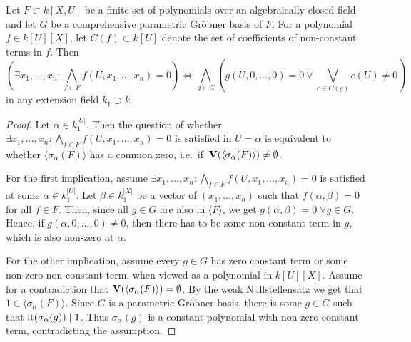 \begin{theorem}
  Let $F \subset k[X, U]$ be a finite set of polynomials over an algebraically closed field and let $G$ be a comprehensive parametric Gröbner basis of $F$. For a polynomial $f \in k[U][X]$, let $C(f) \subset k[U]$ denote the set of coefficients of non-constant terms in $f$. Then \[ \left(\exists x_{1}, \dots, x_{n} : \bigwedge_{f \in F} f(U, x_{1}, \dots, x_{n}) = 0 \right) \iff \bigwedge_{g \in G} \left( g(U, 0, \dots, 0) = 0 \lor \bigvee_{c \in C(g)} c(U) \neq 0 \right)\] in any extension field $k_{1} \supset k$.
\end{theorem}
\begin{proof}
  Let $\alpha \in k_{1}^{|U|}$. Then the question of whether $\exists x_{1}, \dots, x_{n} : \bigwedge_{f \in F} f(U, x_{1}, \dots, x_{n}) = 0$ is satisfied in $U = \alpha$ is equivalent to whether $\langle \sigma_{\alpha}(F) \rangle$ has a common zero, i.e.\ if $\,\operatorname{\mathbf V}(\langle \sigma_{\alpha}(F) \rangle) \neq \emptyset$.

  For the first implication, assume $\exists x_{1}, \dots, x_{n} : \bigwedge_{f \in F} f(U, x_{1}, \dots, x_{n}) = 0$ is satisfied at some $\alpha \in k_{1}^{|U|}$. Let $\beta \in k_{1}^{|X|}$ be a vector of $(x_{1}, \dots, x_{n})$ such that $f(\alpha, \beta) = 0$ for all $f \in F$. Then, since all $g \in G$ are also in $\langle F \rangle$, we get $g(\alpha, \beta) = 0 \; \forall g \in G$. Hence, if $g(\alpha, 0, \dots, 0) \neq 0$, then there has to be some non-constant term in $g$, which is also non-zero at $\alpha$.

  For the other implication, assume every $g \in G$ has zero constant term or some non-zero non-constant term, when viewed as a polynomial in $k[U][X]$. Assume for a contradiction that $\operatorname{\mathbf V}(\langle \sigma_{\alpha}(F) \rangle) = \emptyset$. By the weak Nullstellensatz we get that $1 \in \langle \sigma_{\alpha}(F) \rangle$. Since $G$ is a parametric Gröbner basis, there is some $g \in G$ such that $\operatorname{lt}(\sigma_{\alpha}(g)) \mid 1$. Thus $\sigma_{\alpha}(g)$ is a constant polynomial with non-zero constant term, contradicting the assumption.
\end{proof}




















